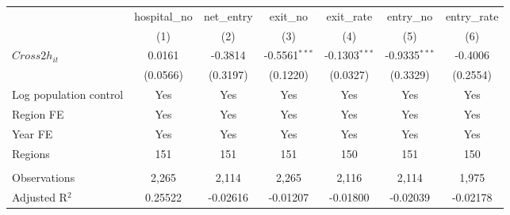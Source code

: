 \begingroup
\centering
\begin{tabular}{lcccccc}
   \toprule
                          & hospital\_no  & net\_entry  & exit\_no        & exit\_rate      & entry\_no       & entry\_rate \\    
                          & (1)           & (2)         & (3)             & (4)             & (5)             & (6)\\  
   \midrule 
   $Cross2h_{it}$         & 0.0161        & -0.3814     & -0.5561$^{***}$ & -0.1303$^{***}$ & -0.9335$^{***}$ & -0.4006\\   
                          & (0.0566)      & (0.3197)    & (0.1220)        & (0.0327)        & (0.3329)        & (0.2554)\\   
   Log population control & Yes           & Yes         & Yes             & Yes             & Yes             & Yes\\  
   Region FE              & Yes           & Yes         & Yes             & Yes             & Yes             & Yes\\  
   Year FE                & Yes           & Yes         & Yes             & Yes             & Yes             & Yes\\  
   Regions                & 151           & 151         & 151             & 150             & 151             & 150\\  
    \\
   Observations           & 2,265         & 2,114       & 2,265           & 2,116           & 2,114           & 1,975\\  
   Adjusted R$^2$         & 0.25522       & -0.02616    & -0.01207        & -0.01800        & -0.02039        & -0.02178\\  
   \bottomrule
\end{tabular}
\par\endgroup
